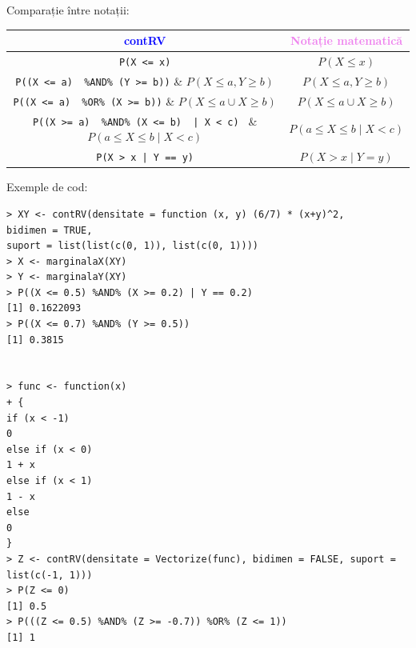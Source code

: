 \documentclass[12pt]{article}
\begin{document}
Comparație între notații:
\begin{center}
\begin{tabular}{|| c | c ||}
\hline
\textcolor{blue}{contRV} & \textcolor{violet}{Notație matematică} \\

\hline
\lstinline|P(X <= x)| & $P(X \leq x)$ \\

\hline
\lstinline|P((X <= a)  %AND% (Y >= b))| & $P(X \leq a, Y \geq b)$ \\

\hline
\lstinline|P((X <= a)  %OR% (X >= b))| & $P(X \leq a \cup X \geq b)$ \\


\hline
\lstinline!P((X >= a)  %AND% (X <= b)  | X < c) ! & $P(a \leq X \leq b \mid X < c)$ \\

\hline
\lstinline!P(X > x | Y == y)! & $P(X > x \mid Y = y)$ \\

\hline

\end{tabular}
\end{center}\vspace*{3\baselineskip}

Exemple de cod:
\begin{lstlisting}[numbers=none]
> XY <- contRV(densitate = function (x, y) (6/7) * (x+y)^2,
bidimen = TRUE,
suport = list(list(c(0, 1)), list(c(0, 1))))
> X <- marginalaX(XY)
> Y <- marginalaY(XY)
> P((X <= 0.5) %AND% (X >= 0.2) | Y == 0.2)
[1] 0.1622093
> P((X <= 0.7) %AND% (Y >= 0.5))
[1] 0.3815


> func <- function(x)
+ {
if (x < -1)
0
else if (x < 0)
1 + x
else if (x < 1)
1 - x
else
0
}
> Z <- contRV(densitate = Vectorize(func), bidimen = FALSE, suport = list(c(-1, 1)))
> P(Z <= 0)
[1] 0.5
> P(((Z <= 0.5) %AND% (Z >= -0.7)) %OR% (Z <= 1))
[1] 1
\end{lstlisting} \pagebreak
\end{document}
